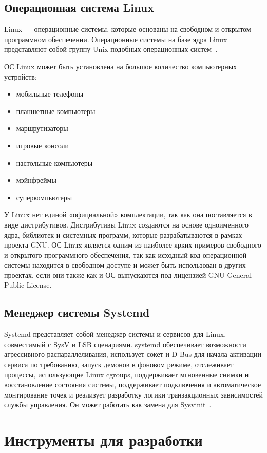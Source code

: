 \subsection{Операционная система Linux}
Linux –-- операционные системы, которые основаны на свободном и открытом
программном обеспечении. Операционные системы на базе ядра Linux представляют
собой группу Unix-подобных операционных систем~\cite{linux}.

ОС Linux может быть установлена на большое количество компьютерных устройств:
\begin{itemize}
    \item мобильные телефоны
    \item планшетные компьютеры
    \item маршрутизаторы
    \item игровые консоли
    \item настольные компьютеры
    \item мэйнфреймы
    \item суперкомпьютеры
\end{itemize}

У Linux нет единой «официальной» комплектации, так как она поставляется в виде
дистрибутивов. Дистрибутивы Linux создаются на основе одноименного ядра,
библиотек и системных программ, которые разрабатываются в рамках проекта GNU.
ОС Linux является одним из наиболее ярких примеров свободного и открытого
программного обеспечения, так как исходный код операционной системы находится в
свободном доступе и может быть использован в других проектах, если они также как
и ОС выпускаются под лицензией GNU General Public License.

\subsection{Менеджер системы Systemd}
Systemd представляет собой менеджер системы и сервисов для Linux, совместимый с
SysV и \hyperlink{lsb}{LSB} сценариями. systemd обеспечивает возможности агрессивного
распараллеливания, использует сокет и D-Bus для начала активации сервиса по
требованию, запуск демонов в фоновом режиме, отслеживает процессы, использующие
Linux cgroups, поддерживает мгновенные снимки и восстановление состояния системы,
поддерживает подключения и автоматическое монтирование точек и реализует разработку
логики транзакционных зависимостей службы управления. Он может работать как
замена для Sysvinit~\cite{systemd}.

\section{Инструменты для разработки}

